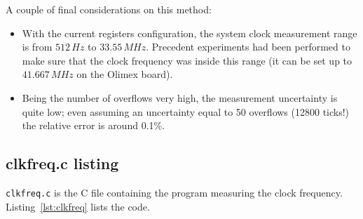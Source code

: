 A couple of final considerations on this method:

\begin{itemize}
	\item With the current registers configuration, the system clock measurement range is from $512\,Hz$ to $33.55\,MHz$. Precedent experiments had been performed to make sure that the clock frequency was inside this range (it can be set up to $41.667\,MHz$ on the Olimex board).
	\item Being the number of overflows very high, the measurement uncertainty is quite low; even assuming an uncertainty equal to 50 overflows (12800 ticks!) the relative error is around 0.1\%.
\end{itemize}

\subsection{clkfreq.c listing}
\texttt{clkfreq.c} is the C file containing the program measuring the clock frequency. Listing~\ref{lst:clkfreq} lists the code.
